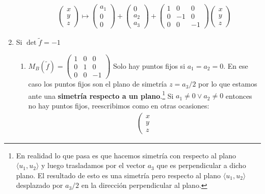 \documentclass[14pt]{book}
\begin{document}
\begin{tm}
\begin{enumerate}
\begin{enumerate}
			\begin{align*}
				\left(\begin{array}{c}
				x \\ y \\ z
				\end{array}\right) \mapsto
				\left(\begin{array}{c}
				a_1 \\ 0 \\ 0
				\end{array}\right) + 
				\left(\begin{array}{c}
				0 \\ a_2 \\ a_3
				\end{array}\right) + 
				\left(\begin{array}{ccc}
				1 & 0 & 0 \\
				0 & -1 & 0 \\
				0 & 0 & -1
				\end{array}\right)\left(\begin{array}{c}
				x \\ y \\ z
				\end{array}\right)
			\end{align*}
		\end{enumerate}
		\item Si $\det \tilde{f} = -1$
		\begin{enumerate}
			\item $M_B(\tilde{f}) = \left(\begin{array}{ccc}
			1 & 0 & 0 \\
			0 & 1 & 0 \\
			0 & 0 & -1
			\end{array}\right)$ Solo hay puntos fijos si $a_1 = a_2 = 0$. En ese caso los puntos fijos son el plano de simetría $z = a_3 / 2$ por lo que estamos ante una \textbf{simetría respecto a un plano}.\footnote{En realidad lo que pasa es que hacemos simetría con respecto al plano $\langle u_1, u_2 \rangle$ y luego trasladamos por el vector $a_3$ que es perpendicular a dicho plano. El resultado de esto es una simetría pero respecto al plano $\langle u_1, u_2 \rangle$ desplazado por $a_3 / 2$ en la dirección perpendicular al plano.} Si $a_1 ≠ 0 \lor a_2 ≠ 0$ entonces no hay puntos fijos, reescribimos como en otras ocasiones:
			\begin{align*}
				\left(\begin{array}{c}
				x \\ y \\ z

\end{array}
\end{align*}
\end{enumerate}
\end{enumerate}
\end{tm}
\end{document}
